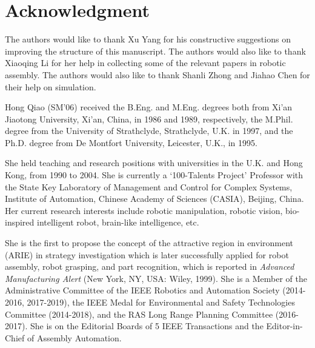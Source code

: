 \documentclass[journal,twoside,web]{ieeecolor}
\begin{document}
\appendices

\section*{Acknowledgment}

The authors would like to thank Xu Yang for his constructive suggestions on improving the structure of this manuscript. The authors would also like to thank Xiaoqing Li for her help in collecting some of the relevant papers in robotic assembly. The authors would also like to thank Shanli Zhong and Jiahao Chen for their help on simulation.





\begin{IEEEbiography}
    {Hong Qiao} (SM'06) received the B.Eng. and M.Eng. degrees both from Xi'an Jiaotong University, Xi’an, China, in 1986 and 1989, respectively, the M.Phil. degree from the University of Strathclyde, Strathclyde, U.K. in 1997, and the Ph.D. degree from De Montfort University, Leicester, U.K., in 1995.

    She held teaching and research positions with universities in the U.K. and Hong Kong, from 1990 to 2004. She is currently a `100-Talents Project' Professor with the State Key Laboratory of Management and Control for Complex Systems, Institute of Automation, Chinese Academy of Sciences (CASIA), Beijing, China. Her current research interests include robotic manipulation, robotic vision, bio-inspired intelligent robot, brain-like intelligence, etc.

    She is the first to propose the concept of the attractive region in environment (ARIE) in strategy investigation which is later successfully applied for robot assembly, robot grasping, and part recognition, which is reported in \textit{Advanced Manufacturing Alert} (New York, NY, USA: Wiley, 1999). She is a Member of the Administrative Committee of the IEEE Robotics and Automation Society (2014-2016, 2017-2019), the IEEE Medal for Environmental and Safety Technologies Committee (2014-2018), and the RAS Long Range Planning Committee (2016-2017). She is on the Editorial Boards of 5 IEEE Transactions and the Editor-in-Chief of Assembly Automation.
\end{IEEEbiography}
\vfill
\end{document}
